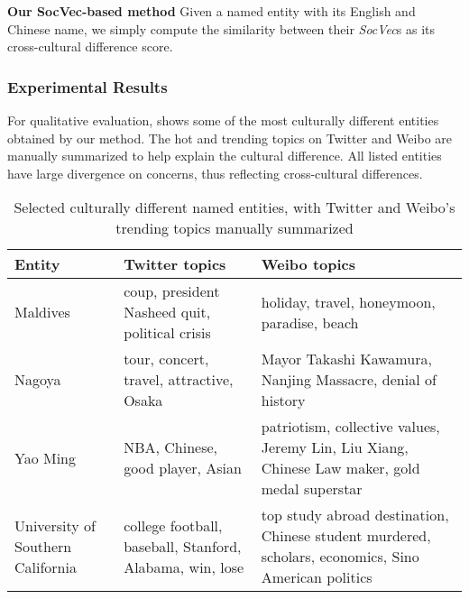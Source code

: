 \textbf{{Our SocVec-based method}} Given a named entity with its English and 
Chinese name, we simply compute the similarity between their 
\textit{SocVec}s as its cross-cultural difference score. 

\subsubsection{Experimental Results}

For qualitative evaluation,  shows some of 
the most culturally different entities obtained by our method. 
The hot and trending topics on Twitter and Weibo are 
manually summarized to help explain the cultural difference. 
All listed entities have large divergence on concerns, 
thus reflecting cross-cultural differences.
\begin{table*}[th!]
	\footnotesize
	\centering
	\caption{{Selected culturally different named entities, with Twitter and Weibo's trending topics manually summarized}}
	\begin{tabular}{|L{1.5cm}|L{5cm}|L{8cm}|}
		\hline
		\textbf{Entity} & \textbf{Twitter topics} & \textbf{Weibo topics}
		\\ \hline
		Maldives & coup, president Nasheed quit, political crisis & holiday, travel, honeymoon, paradise, beach \\ \hline
		Nagoya & tour, concert, travel, attractive, Osaka & Mayor Takashi Kawamura, Nanjing Massacre, denial of history\\  \hline
		Yao Ming & NBA, Chinese, good player, Asian  & patriotism, collective values, Jeremy Lin, Liu Xiang, Chinese Law maker, gold medal superstar   \\ \hline
		University of Southern California & college football, baseball, Stanford, Alabama, win, lose & top study abroad destination, Chinese student murdered, scholars, economics, Sino American politics \\ \hline
	\end{tabular}
	\label{tab:mcdne_res_4}
\end{table*}

